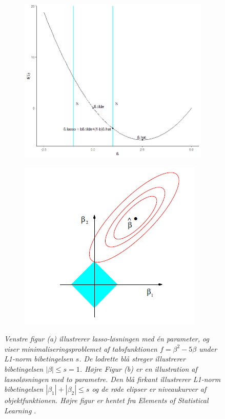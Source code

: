\documentclass[11pt,a4paper]{article}
\begin{document}
\begin{figure}[h!]
  \centering
    \begin{subfigure}[b]{0.48\linewidth}
    \includegraphics[width=\textwidth]{LAMBDABETA.png}
    \caption{}
  \label{fig:lasso1dim}
  \end{subfigure}
  \begin{subfigure}[b]{0.48\linewidth}
    \includegraphics[width=\textwidth]{Lasso-ESL.PNG}
    \caption{}
    \label{fig:lasso2dim}
  \end{subfigure}
  \caption{\textit{Venstre figur (a) illustrerer lasso-løsningen med én parameter, og viser minimaliseringsproblemet af tabsfunktionen $f=\beta^2-5\beta$ under L1-norm bibetingelsen $s$. De lodrette blå streger illustrerer bibetingelsen $|\beta|\leq s=1$. Højre Figur (b) er en illustration af lassoløsningen med to parametre. Den blå firkant illustrerer L1-norm bibetingelsen $|\beta_1| + |\beta_2| \leq  s$ og de røde elipser er niveaukurver af objektfunktionen. Højre figur er hentet fra Elements of Statistical Learning \cite{ESL}}.}
\label{fig:lassofigure}\end{figure}
\end{document}
